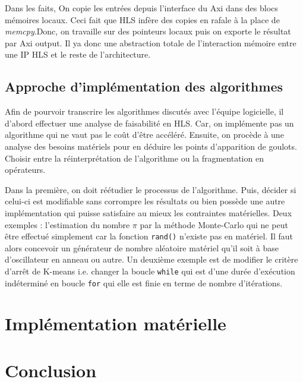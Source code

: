 \documentclass[12pt,a4paper]{article}
\begin{document}
Dans les faits, On copie les entrées depuis l'interface du Axi dans des blocs mémoires locaux. Ceci fait que HLS infère des copies en rafale à la place de \textit{memcpy}.Donc, on travaille sur des pointeurs locaux puis on exporte le résultat par Axi output. Il ya donc une abstraction totale de l'interaction mémoire entre une IP HLS et le reste de l'architecture.

\subsection{Approche d'implémentation des algorithmes}
Afin de pourvoir transcrire les algorithmes discutés avec l'équipe logicielle, il d'abord effectuer une analyse de faisabilité en HLS. Car, on implémente pas un algorithme qui ne vaut pas le coût d'être accéléré. Ensuite, on procède à une analyse des besoins matériels pour en déduire les points d'apparition de goulots. Choisir entre la réinterprétation de l'algorithme ou la fragmentation en opérateurs.

Dans la première, on doit réétudier le processus de l'algorithme. Puis, décider si celui-ci est modifiable sans corrompre les résultats ou bien possède une autre implémentation qui puisse satisfaire au mieux les contraintes matérielles. Deux exemples : l'estimation du nombre $\pi$ par la méthode Monte-Carlo qui ne peut être effectué simplement car la fonction \texttt{rand()} n'existe pas en matériel. Il faut alors concevoir un générateur de nombre aléatoire matériel qu'il soit à base d'oscillateur en anneau ou autre. Un deuxième exemple est de modifier le critère d'arrêt de K-means i.e. changer la boucle \texttt{while} qui est d'une durée d'exécution indéterminé en boucle \texttt{for} qui elle est finie en terme de nombre d'itérations.



\section{Implémentation matérielle}





\section{Conclusion}
\end{document}

